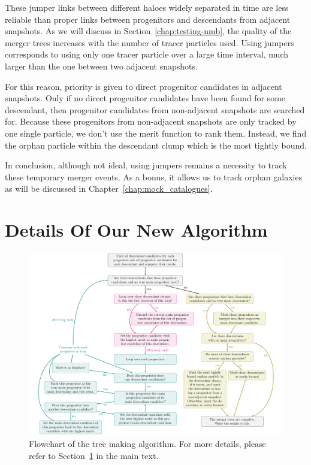 These jumper links between different haloes widely separated in time
are less reliable than proper links between progenitors and
descendants from adjacent snapshots.  As we will discuss
in Section~\ref{chap:testing-nmb}, the quality of the merger trees
increases with the number of tracer particles used.  Using jumpers
corresponds to using only one tracer particle over a large time interval,
much larger than the one between two adjacent snapshots.

For this reason, priority is given to direct progenitor candidates in
adjacent snapshots.  Only if no direct progenitor candidates have been
found for some descendant, then progenitor candidates from
non-adjacent snapshots are searched for.  Because these progenitors
from non-adjacent snapshots are only tracked by one single particle,
we don't use the merit function to rank them.  Instead, we find the
orphan particle within the descendant clump which is the most tightly
bound.

In conclusion, although not ideal, using jumpers remains a necessity
to track these temporary merger events.  As a bonus, it allows us to
track orphan galaxies as will be discussed in
Chapter~\ref{chap:mock_catalogues}.





\chapter{Details Of Our New Algorithm \acacia}\label{chap:my_code}

\begin{figure}
	\includegraphics[width=\textwidth]{./figures/ACACIA/tikz/tree_algorithm_flowchart.pdf}%
	\caption{\label{fig:flowchart}
    	Flowchart of the tree making algorithm. For more details, please refer to Section~\ref{chap:my_code} in the main text.
  }
\end{figure}

